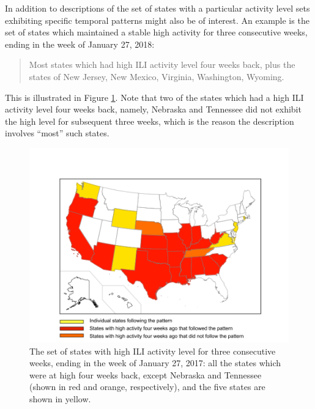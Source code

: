 In addition to descriptions of the set of states with a particular activity
level sets exhibiting specific temporal patterns might also be of interest.
An example is the set of states which maintained a 
stable high activity for three consecutive weeks, ending in the week of 
January 27, 2018:
\begin{quote}
Most states which had high ILI activity level four weeks back,
plus the states of New Jersey, New Mexico, Virginia, Washington, Wyoming.
\end{quote}
This is illustrated in Figure \ref{fig:jan27}. Note that two of the
states which had a high ILI activity level four weeks back, namely,
Nebraska and Tennessee did not exhibit the high level for subsequent
three weeks, which is the reason the description involves ``most'' such states.


\begin{figure}[!ht]
\centering
\includegraphics[scale = 0.4]{./figures/jan27.png}
\caption{
The set of states with high ILI activity level for three consecutive
weeks, ending in the week of January 27, 2017: all the states
which were at high four weeks back, except Nebraska and Tennessee
(shown in red and orange, respectively), and the five states are shown in yellow.
}
\label{fig:jan27}
\end{figure}

